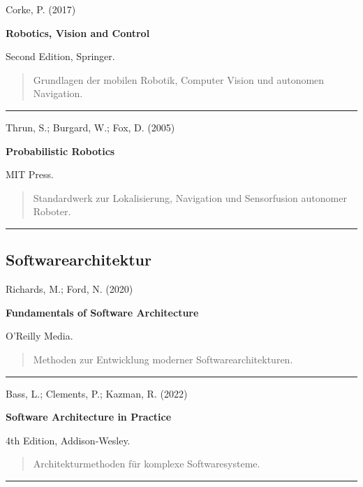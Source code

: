 Corke, P. (2017)

\textbf{Robotics, Vision and Control}

Second Edition, Springer.

\begin{quote}
Grundlagen der mobilen Robotik, Computer Vision und autonomen
Navigation.
\end{quote}

\begin{center}\rule{0.5\linewidth}{0.5pt}\end{center}

Thrun, S.; Burgard, W.; Fox, D. (2005)

\textbf{Probabilistic Robotics}

MIT Press.

\begin{quote}
Standardwerk zur Lokalisierung, Navigation und Sensorfusion autonomer
Roboter.
\end{quote}

\begin{center}\rule{0.5\linewidth}{0.5pt}\end{center}

\subsection{Softwarearchitektur}\label{softwarearchitektur-1}

Richards, M.; Ford, N. (2020)

\textbf{Fundamentals of Software Architecture}

O'Reilly Media.

\begin{quote}
Methoden zur Entwicklung moderner Softwarearchitekturen.
\end{quote}

\begin{center}\rule{0.5\linewidth}{0.5pt}\end{center}

Bass, L.; Clements, P.; Kazman, R. (2022)

\textbf{Software Architecture in Practice}

4th Edition, Addison-Wesley.

\begin{quote}
Architekturmethoden für komplexe Softwaresysteme.
\end{quote}

\begin{center}\rule{0.5\linewidth}{0.5pt}\end{center}

